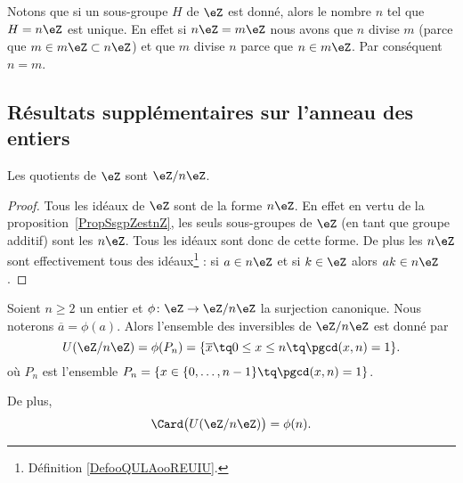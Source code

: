Notons que si un sous-groupe \( H\) de \( \eZ\) est donné, alors le nombre \( n\) tel que \( H=n\eZ\) est unique. En effet si \( n\eZ=m\eZ\) nous avons que \( n\) divise \( m\) (parce que \( m\in m\eZ\subset n\eZ\)) et que \( m\) divise \( n\) parce que \( n\in m\eZ\). Par conséquent \( n=m\).

\subsection{Résultats supplémentaires sur l'anneau des entiers}

\begin{corollary}       \label{CORooLINXooBlUKPG}
	Les quotients de \( \eZ\) sont \( \eZ/n\eZ\).
\end{corollary}

\begin{proof}
	Tous les idéaux de \( \eZ\) sont de la forme \( n\eZ\). En effet en vertu de la proposition~\ref{PropSsgpZestnZ}, les seuls sous-groupes de \( \eZ\) (en tant que groupe additif) sont les \( n\eZ\). Tous les idéaux sont donc de cette forme. De plus les \( n\eZ\) sont effectivement tous des idéaux\footnote{Définition \ref{DefooQULAooREUIU}.} : si \( a\in n\eZ\) et si \( k\in \eZ\) alors \( ak\in n\eZ\).
\end{proof}

\begin{proposition}     \label{PropZpintssiprempUzn}
	Soient \( n\geq 2\) un entier et \( \phi\colon \eZ\to \eZ/n\eZ\) la surjection canonique. Nous noterons \( \overline a=\phi(a)\). Alors l'ensemble des inversibles de \( \eZ/n\eZ\) est donné par
	\begin{equation}
		U(\eZ/n\eZ)=\phi(P_n)=\{ \overline x\tq 0\leq x\leq n\tq\pgcd(x,n)=1 \}.
	\end{equation}
	où \( P_n\) est l'ensemble \( P_n=\{ x\in\{ 0,\ldots,n-1 \}\tq\pgcd(x,n)=1 \}\).

	De plus,
	\begin{equation}
		\Card\big( U(\eZ/n\eZ) \big)=\phi(n).
	\end{equation}
\end{proposition}

